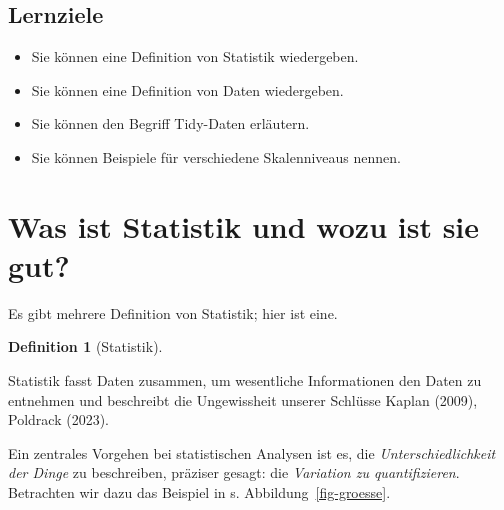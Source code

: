 \documentclass[
  a4paper,
  DIV=11]{scrreprt}
\providecommand{\tightlist}{%
  \setlength{\itemsep}{0pt}\setlength{\parskip}{0pt}}\usepackage{longtable,booktabs,array}
\theoremstyle{definition}
\newtheorem{definition}{Definition}[chapter]
\theoremstyle{definition}
\theoremstyle{remark}
\begin{document}
\hypertarget{lernziele-1}{%
\subsection{Lernziele}\label{lernziele-1}}

\begin{itemize}
\tightlist
\item
  Sie können eine Definition von Statistik wiedergeben.
\item
  Sie können eine Definition von Daten wiedergeben.
\item
  Sie können den Begriff Tidy-Daten erläutern.
\item
  Sie können Beispiele für verschiedene Skalenniveaus nennen.
\end{itemize}

\hypertarget{was-ist-statistik-und-wozu-ist-sie-gut}{%
\section{Was ist Statistik und wozu ist sie
gut?}\label{was-ist-statistik-und-wozu-ist-sie-gut}}

Es gibt mehrere Definition von Statistik; hier ist eine.

\leavevmode{}%
\begin{definition}[Statistik]\label{def-statistik}

Statistik fasst Daten zusammen, um wesentliche Informationen den Daten
zu entnehmen und beschreibt die Ungewissheit unserer Schlüsse Kaplan
(2009), Poldrack (2023).

\end{definition}

Ein zentrales Vorgehen bei statistischen Analysen ist es, die
\emph{Unterschiedlichkeit der Dinge} zu beschreiben, präziser gesagt:
die \emph{Variation zu quantifizieren}. Betrachten wir dazu das Beispiel
in s. Abbildung~\ref{fig-groesse}.
\end{document}
